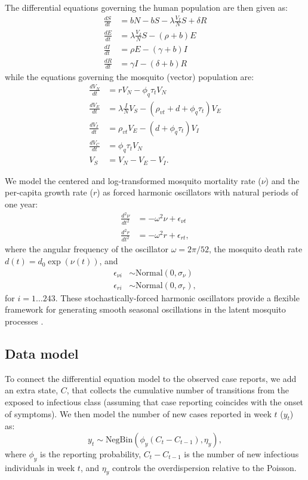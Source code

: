\documentclass[10pt,letterpaper]{article}
\begin{document}
The differential equations governing the human population are then given as:
\begin{align} 
\frac{dS}{dt} &= bN - bS - \lambda \frac{V_{I}}{N} S + \delta R\\
\frac{dE}{dt} &= \lambda \frac{V_{I}}{N} S - (\rho + b)E\\
\frac{dI}{dt} &= \rho E - (\gamma + b)I\\
\frac{dR}{dt} &= \gamma I - (\delta + b)R
\end{align}
while the equations governing the mosquito (vector) population are:
\begin{align}
\frac{dV_N}{dt} & = r V_N - \phi_q \tau_t V_N \\
\frac{dV_E}{dt} &= \lambda \frac{I}{N} V_S - (\rho_{vt} + d + \phi_q \tau_t)V_E\\
\frac{dV_I}{dt} &= \rho_{vt} V_E - (d + \phi_q \tau_t) V_I\\
\frac{dV_C}{dt} & = \phi_q \tau_t V_N\\
V_S &= V_N - V_E - V_I.
\end{align}

We model the centered and log-transformed mosquito mortality rate ($\nu$) and the per-capita growth rate ($r$) as forced harmonic oscillators with natural periods of one year:
\begin{align}
\frac{d^2\nu}{dt^2} &= -\omega^2 \nu + \epsilon_{\nu t}\\
\frac{d^2 r}{dt^2} &= -\omega^2 r + \epsilon_{rt},
\end{align}
where the angular frequency of the oscillator $\omega = 2\pi / 52$, the mosquito death rate $d(t) = d_0 \exp(\nu(t))$, and
\begin{align}
\epsilon_{\nu i} & \sim \text{Normal}(0, \sigma_{\nu})\\
\epsilon_{ri} & \sim \text{Normal}(0, \sigma_r),
\end{align}
for $i = 1 \dots 243$.
These stochastically-forced harmonic oscillators provide a flexible framework for generating smooth seasonal oscillations in the latent mosquito processes \cite{Ramsay2017}.

\subsection*{Data model}

To connect the differential equation model to the observed case reports, we add an extra state, $C$, that collects the cumulative number of transitions from the exposed to infectious class (assuming that case reporting coincides with the onset of symptoms).
We then model the number of new cases reported in week $t$ ($y_t$) as:
\begin{equation}
y_t  \sim \text{NegBin}(\phi_y (C_t - C_{t-1}), \eta_y),
\end{equation}
where $\phi_y$ is the reporting probability, $C_t - C_{t-1}$ is the number of new infectious individuals in week $t$, and $\eta_y$ controls the overdispersion relative to the Poisson.
\end{document}
